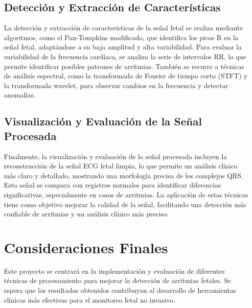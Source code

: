 \documentclass[10pt, conference]{IEEEtran}
\begin{document}
\subsection{Detección y Extracción de Características}

La detección y extracción de características de la señal fetal se realiza mediante algoritmos, como el Pan-Tompkins modificado, que identifica los picos R en la señal fetal, adaptándose a su baja amplitud y alta variabilidad. Para evaluar la variabilidad de la frecuencia cardíaca, se analiza la serie de intervalos RR, lo que permite identificar posibles patrones de arritmias. También se recurre a técnicas de análisis espectral, como la transformada de Fourier de tiempo corto (STFT) y la transformada wavelet, para observar cambios en la frecuencia y detectar anomalías.

\subsection{Visualización y Evaluación de la Señal Procesada}

Finalmente, la visualización y evaluación de la señal procesada incluyen la reconstrucción de la señal ECG fetal limpia, lo que permite un análisis clínico más claro y detallado, mostrando una morfología precisa de los complejos QRS. Esta señal se compara con registros normales para identificar diferencias significativas, especialmente en casos de arritmias. La aplicación de estas técnicas tiene como objetivo mejorar la calidad de la señal, facilitando una detección más confiable de arritmias y un análisis clínico más preciso.

\section{Consideraciones Finales}

Este proyecto se centrará en la implementación y evaluación de diferentes técnicas de procesamiento para mejorar la detección de arritmias fetales. Se espera que los resultados obtenidos contribuyan al desarrollo de herramientas clínicas más efectivas para el monitoreo fetal no invasivo.
\end{document}
